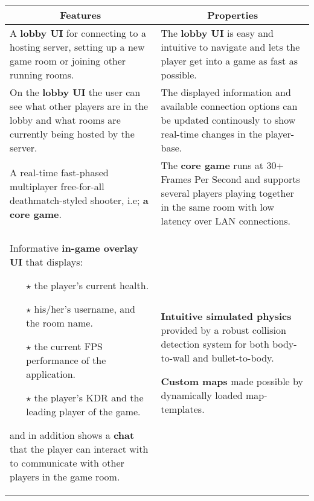 \begin{table}[h]
    \centering
    \begin{tabular}{p{53mm}p{53mm}}
        \multicolumn{1}{c}{\textbf{Features}}  &  \multicolumn{1}{c}{\textbf{Properties}}  \\
        \hline 
        A \textbf{lobby UI} for connecting to a hosting server, setting up a new game room or joining other running rooms. 
        
        & The \textbf{lobby UI} is easy and intuitive to navigate and lets the player get into a game as fast as possible. \\
        
        On the \textbf{lobby UI} the user can see what other players are in the lobby and what rooms are currently being hosted by the server. 
        
        & The displayed information and available connection options can be updated continously to show real-time changes in the player-base.\\ 
        \hline
        
        
        A real-time fast-phased multiplayer free-for-all deathmatch-styled shooter, i.e; \textbf{a core game}. 
        &The \textbf{core game} runs at 30+ Frames Per Second and supports several players playing together in the same room with low latency over LAN connections. \\
        
        Informative \textbf{in-game overlay UI} that displays: 
        \begin{itemize}
            \item[$\star$] the player's current health.
            \item[$\star$] his/her's username, and the room name.
            \item[$\star$] the current FPS performance of the application.
            \item[$\star$] the player's KDR and the leading player of the game.
        \end{itemize} 
        and in addition shows a \textbf{chat} that the player can interact with to communicate with other players in the game room. 
        
        & \textbf{Intuitive simulated physics} provided by a robust collision detection system for both body-to-wall and bullet-to-body. 
        
        \textbf{Custom maps} made possible by dynamically loaded map-templates. 
        

\end{tabular}
\end{table}

